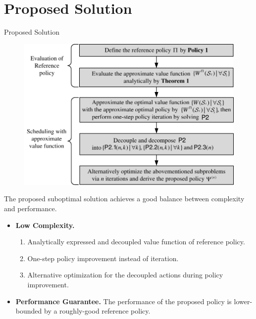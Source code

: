 \documentclass[aspectratio=169]{beamer}
\begin{document}
\section{Proposed Solution}
\begin{frame}{Proposed Solution}{}
    \begin{minipage}[t]{0.45\linewidth}
        \begin{figure}
            \centering
            \includegraphics[width=\textwidth]{fig/framework_slides_v2.pdf}
        \end{figure}
    \end{minipage}
    \hspace{0.01\linewidth}
    \begin{minipage}[t]{0.5\linewidth}
        \small 
        The proposed suboptimal solution achieves a good balance between complexity and performance.
        \begin{itemize}
            \item \textbf{Low Complexity.}
            \begin{enumerate}
                \item Analytically expressed and decoupled value function of reference policy.
                \item One-step policy improvement instead of iteration.
                \item Alternative optimization for the decoupled actions during policy improvement.
            \end{enumerate}
            \item \textbf{Performance Guarantee.} {The performance of the proposed policy is lower-bounded by a roughly-good reference policy.}
        \end{itemize}
    \end{minipage}
\end{frame}
\end{document}
